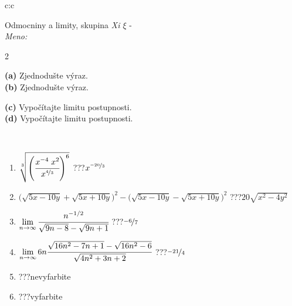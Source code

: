 \documentclass[10pt]{report}
\begin{document}
\begin{tabular}{c:c}
\begin{minipage}[c][104.5mm][t]{0.5\linewidth}
\begin{center}
\vspace{7mm}
{\huge Odmocniny a limity, skupina \textit{Xi $\xi$} -}\\[5mm]
\textit{Meno:}\phantom{xxxxxxxxxxxxxxxxxxxxxxxxxxxxxxxxxxxxxxxxxxxxxxxxxxxxxxxxxxxxxxxxx}\\[5mm]
\begin{minipage}{0.95\linewidth}
\begin{center}
{\small \begin{multicols}{2} \raggedright
\textbf{(a)} Zjednodušte výraz. \\[1mm]
\textbf{(b)} Zjednodušte výraz. \par \columnbreak
\textbf{(c)} Vypočítajte limitu postupnosti. \\[1mm]
\textbf{(d)} Vypočítajte limitu postupnosti.
\end{multicols}
}
\end{center}
\end{minipage}
\\[4mm]
\begin{minipage}{0.79\linewidth}
\begin{center}
\begin{varwidth}{\linewidth}
\begin{enumerate}
\small
\item $\sqrt[3]{\left(\cfrac{x^{-4}\;x^{2}}{x^{\nicefrac{4}{3}}}\right)^{6}}$\quad \dotfill\; ???\;\dotfill \quad $x^{\nicefrac{-20}{3}}$
\item {\footnotesize{\scriptsize$\big(\sqrt{5x-10y}+\sqrt{5x+10y}\big)^2-\big(\sqrt{5x-10y}-\sqrt{5x+10y}\big)^2$}\quad \dotfill\; ???\;\dotfill \quad $20\sqrt{x^2-4y^2}$}
\item $\lim\limits_{n\to\infty}\cfrac{n^{-1/2}}{\sqrt{9n-8}-\sqrt{9n+1}}$\quad \dotfill\; ???\;\dotfill \quad $\nicefrac{-6}{7}$
\item $\lim\limits_{n\to\infty}6n\cfrac{\sqrt{16n^2-7n+1}-\sqrt{16n^2-6}}{\sqrt{4n^2+3n+2}}$\quad \dotfill\; ???\;\dotfill \quad $\nicefrac{-21}{4}$
\item \quad \dotfill\; ???\;\dotfill \quad nevyfarbite
\item \quad \dotfill\; ???\;\dotfill \quad vyfarbite
\end{enumerate}
\end{varwidth}
\end{center}

\end{minipage}
\end{center}
\end{minipage}
\end{tabular}
\end{document}

